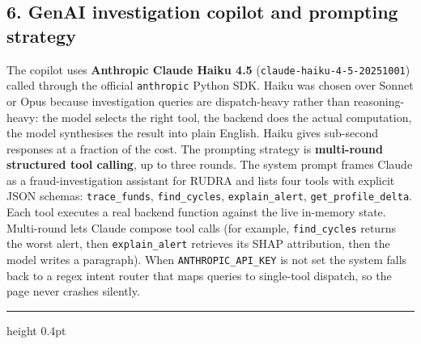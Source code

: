 \documentclass[10pt,a4paper]{article}
\begin{document}
\subsection*{6. GenAI investigation copilot and prompting strategy}
The copilot uses \textbf{Anthropic Claude Haiku 4.5} (\texttt{claude-haiku-4-5-20251001}) called through the official \texttt{anthropic} Python SDK. Haiku was chosen over Sonnet or Opus because investigation queries are dispatch-heavy rather than reasoning-heavy: the model selects the right tool, the backend does the actual computation, the model synthesises the result into plain English. Haiku gives sub-second responses at a fraction of the cost. The prompting strategy is \textbf{multi-round structured tool calling}, up to three rounds. The system prompt frames Claude as a fraud-investigation assistant for RUDRA and lists four tools with explicit JSON schemas: \texttt{trace\_funds}, \texttt{find\_cycles}, \texttt{explain\_alert}, \texttt{get\_profile\_delta}. Each tool executes a real backend function against the live in-memory state. Multi-round lets Claude compose tool calls (for example, \texttt{find\_cycles} returns the worst alert, then \texttt{explain\_alert} retrieves its SHAP attribution, then the model writes a paragraph). When \texttt{ANTHROPIC\_API\_KEY} is not set the system falls back to a regex intent router that maps queries to single-tool dispatch, so the page never crashes silently.

\vspace{2pt}
\hrule height 0.4pt
\vspace{2pt}
\end{document}
